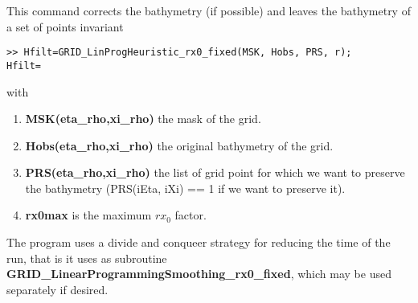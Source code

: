 \documentclass[12pt]{article}
\begin{document}
This command corrects the bathymetry (if possible) and leaves the bathymetry of a set of points invariant
\begin{verbatim}
>> Hfilt=GRID_LinProgHeuristic_rx0_fixed(MSK, Hobs, PRS, r);
Hfilt=
\end{verbatim}
with
\begin{enumerate}
\item {\bf MSK(eta\_rho,xi\_rho)} the mask of the grid.
\item {\bf Hobs(eta\_rho,xi\_rho)} the original bathymetry of the grid.
\item {\bf PRS(eta\_rho,xi\_rho)} the list of grid point for which
we want to preserve the bathymetry
(PRS(iEta, iXi) == 1 if we want to preserve it).
\item {\bf rx0max} is the maximum $rx_0$ factor.
\end{enumerate}
The program uses a divide and conqueer strategy for reducing the time of
the run, that is it uses as subroutine {\bf GRID\_LinearProgrammingSmoothing\_rx0\_fixed}, which may be used separately if desired.







%
\end{document}
